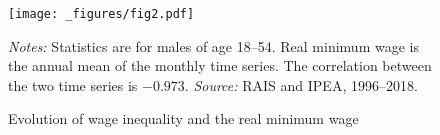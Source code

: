 \begin{figure}[!htb]
  \centering
  \caption{\label{fig:var_minw_short}Evolution of wage inequality and the real minimum wage}
  \prefigvspace
  \texttt{[image: \_figures/fig2.pdf]} %
  \\
  \postfigvspace
  \begin{minipage}[t]{1\columnwidth}%
    \begin{spacing}{0.75}
      \emph{\scriptsize{}Notes: }{\scriptsize{}Statistics are for males
      of age 18--54. Real minimum wage is the annual mean of the monthly
      time series. The correlation between the two time series is $-0.973$. %
      \emph{\scriptsize{}Source: } RAIS and IPEA, 1996--2018.}
    \end{spacing}
  \end{minipage}
\end{figure}
